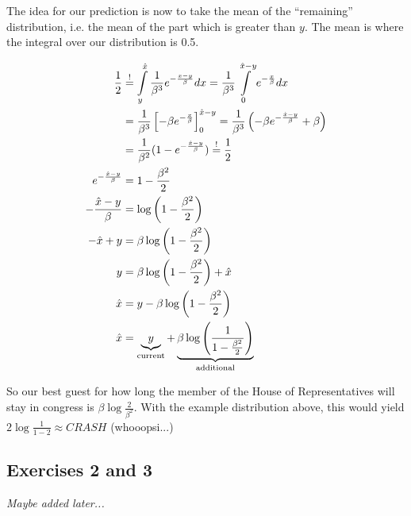 \documentclass[../main/Notes.tex]{subfiles}
\begin{document}
The idea for our prediction is now to take the mean of the ``remaining'' distribution, i.e. the mean of the part which is greater than $y$. The mean is where the integral over our distribution is 0.5.

\begin{align*}
\frac{1}{2} &\stackrel{!}{=} \int\limits_y^{\est{x}} \frac{1}{\beta^3} e^{-\frac{x-y}{\beta} } dx = \frac{1}{\beta^3} \int\limits_0^{\est{x}-y} e^{-\frac{x}{\beta}} dx \\
&= \frac{1}{\beta^3} \left[-\beta e^{-\frac{x}{\beta}}\right]_0^{\est{x}-y} = \frac{1}{\beta^3} \left( -\beta e^{-\frac{\est{x}-y}{\beta}} + \beta \right) \\
&= \frac{1}{\beta^2}( 1 - e^{-\frac{\est{x}-y}{\beta}}) \stackrel{!}{=} \frac{1}{2} \\
e^{-\frac{\est{x}-y}{\beta}} &= 1 - \frac{\beta^2}{2} \\
-\frac{\est{x}-y}{\beta} &= \log {\left(1 - \frac{\beta^2}{2}\right)} \\
-\est{x}+y &= \beta \log{\left(1-\frac{\beta^2}{2}\right)} \\
y &= \beta \log{\left(1 - \frac{\beta^2}{2}\right)} + \est{x}\\
\est{x} &= y-\beta \log{\left(1 - \frac{\beta^2}{2}\right)} \\
\est{x} &= \underbrace{y}_{\text{current}}+\underbrace{\beta \log{\left(\frac{1}{1-\frac{\beta^2}{2}}\right)}}_{\text{additional}}
\end{align*}

So our best guest for how long the member of the House of Representatives will stay in congress is $\beta \log{\frac{2}{\beta^2}}$. With the example distribution above, this would yield $2 \log{\frac{1}{1-2}} \approx CRASH$ (whooopsi...)



\subsection*{Exercises 2 and 3}
\emph{Maybe added later...}
\end{document}
